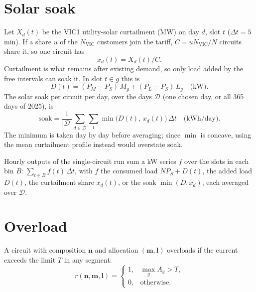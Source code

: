 \documentclass[11pt,a4paper]{article}
\begin{document}
\section{Solar soak}
Let \(X_d(t)\) be the VIC1 utility-solar curtailment (MW) on day \(d\), slot \(t\)
(\(\Delta t=5\) min). If a share \(u\) of the \(N_{\mathrm{VIC}}\) customers join the
tariff, \(C=uN_{\mathrm{VIC}}/N\) circuits share it, so one circuit has
\begin{equation}
  x_d(t)=X_d(t)/C .
\end{equation}
Curtailment is what remains after existing demand, so only load added by the
free intervals can soak it. In slot \(t\in g\) this is
\begin{equation}
  D(t)=(P_M-P_S)\,M_g+(P_L-P_S)\,L_g \quad\text{(kW)}.
\end{equation}
The solar soak per circuit per day, over the days \(\mathcal D\) (one chosen day, or
all 365 days of 2025), is
\begin{equation}
  \text{soak}=\frac{1}{|\mathcal D|}\sum_{d\in\mathcal D}\sum_t \min\bigl(D(t),\,x_d(t)\bigr)\,\Delta t
  \quad\text{(kWh/day)}.
\end{equation}
The minimum is taken day by day before averaging; since \(\min\) is concave,
using the mean curtailment profile instead would overstate soak.

Hourly outputs of the single-circuit run sum a kW series \(f\) over the slots in each
bin \(B\): \(\sum_{t\in B} f(t)\,\Delta t\), with \(f\) the consumed load
\(N P_S + D(t)\), the added load \(D(t)\), the curtailment share \(x_d(t)\), or the
soak \(\min(D,x_d)\), each averaged over \(\mathcal D\).

\section{Overload}
A circuit with composition \(\boldsymbol n\) and allocation \((\boldsymbol m,\boldsymbol l)\)
overloads if the current exceeds the limit \(T\) in any segment:
\begin{equation}
  r(\boldsymbol n,\boldsymbol m,\boldsymbol l)=
  \begin{cases}1, & \max_g A_g > T,\\ 0, & \text{otherwise.}\end{cases}
\end{equation}
\end{document}
